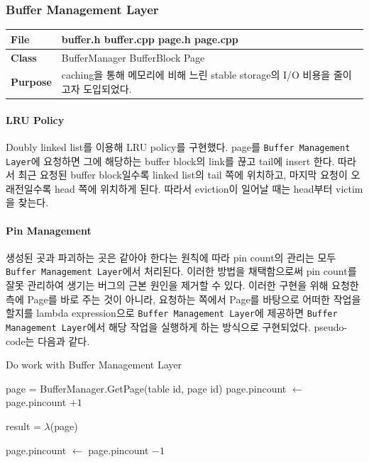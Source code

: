 \documentclass[main.tex]{subfiles}
\begin{document}
\subsubsection{Buffer Management Layer}
\begin{table}[!htb]
	\begin{tabularx}{\textwidth}{|l|X|}
		\hline
		\textbf{File} & buffer.h buffer.cpp page.h page.cpp \\
		\hline
		\textbf{Class} & BufferManager BufferBlock Page \\
		\hline
		\textbf{Purpose} & caching을 통해 메모리에 비해 느린 stable storage의 I/O 비용을 줄이고자 도입되었다. \\
		\hline
	\end{tabularx}
\end{table}


\paragraph{LRU Policy}
Doubly linked list를 이용해 LRU policy를 구현했다. page를 \texttt{Buffer Management Layer}에 요청하면 그에 해당하는 buffer block의 link를 끊고 tail에 insert 한다. 따라서 최근 요청된 buffer block일수록 linked list의 tail 쪽에 위치하고, 마지막 요청이 오래전일수록 head 쪽에 위치하게 된다. 따라서 eviction이 일어날 때는 head부터 victim을 찾는다.

\paragraph{Pin Management}
생성된 곳과 파괴하는 곳은 같아야 한다는 원칙에 따라 pin count의 관리는 모두 \texttt{Buffer Management Layer}에서 처리된다. 이러한 방법을 채택함으로써 pin count를 잘못 관리하여 생기는 버그의 근본 원인을 제거할 수 있다. 이러한 구현을 위해 요청한 측에 Page를 바로 주는 것이 아니라, 요청하는 쪽에서 Page를 바탕으로 어떠한 작업을 할지를 lambda expression으로 \texttt{Buffer Management Layer}에 제공하면 \texttt{Buffer Management Layer}에서 해당 작업을 실행하게 하는 방식으로 구현되었다. pseudo-code는 다음과 같다.

\begin{algorithm}
	\caption{Do work with Buffer Management Layer}
	\begin{algorithmic}
		
			\State page = BufferManager.GetPage(table id, page id)
			\State page.pincount $\gets$ page.pincount $+ 1$
			
			\State result = $\lambda$(page)
			
			\State page.pincount $\gets$ page.pincount $- 1$
			
			\State {}		
		\EndFunction
	\end{algorithmic}
\end{algorithm}
\end{document}
